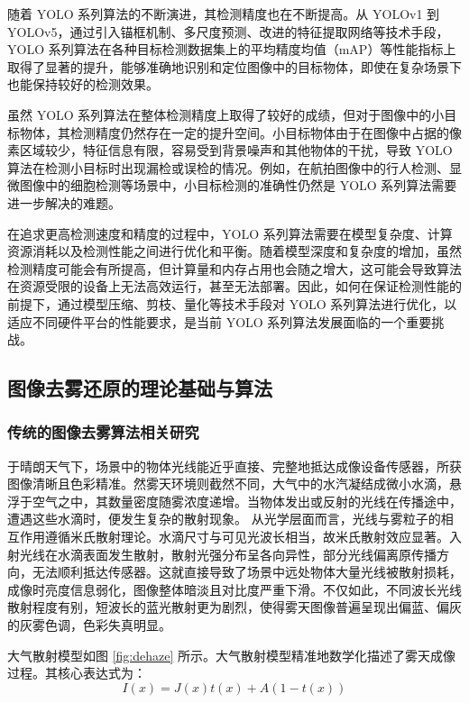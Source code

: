随着 YOLO 系列算法的不断演进，其检测精度也在不断提高。从 YOLOv1 到 YOLOv5，通过引入锚框机制、多尺度预测、改进的特征提取网络等技术手段，YOLO 系列算法在各种目标检测数据集上的平均精度均值（mAP）等性能指标上取得了显著的提升，能够准确地识别和定位图像中的目标物体，即使在复杂场景下也能保持较好的检测效果。

虽然 YOLO 系列算法在整体检测精度上取得了较好的成绩，但对于图像中的小目标物体，其检测精度仍然存在一定的提升空间。小目标物体由于在图像中占据的像素区域较少，特征信息有限，容易受到背景噪声和其他物体的干扰，导致 YOLO 算法在检测小目标时出现漏检或误检的情况。例如，在航拍图像中的行人检测、显微图像中的细胞检测等场景中，小目标检测的准确性仍然是 YOLO 系列算法需要进一步解决的难题。

在追求更高检测速度和精度的过程中，YOLO 系列算法需要在模型复杂度、计算资源消耗以及检测性能之间进行优化和平衡。随着模型深度和复杂度的增加，虽然检测精度可能会有所提高，但计算量和内存占用也会随之增大，这可能会导致算法在资源受限的设备上无法高效运行，甚至无法部署。因此，如何在保证检测性能的前提下，通过模型压缩、剪枝、量化等技术手段对 YOLO 系列算法进行优化，以适应不同硬件平台的性能要求，是当前 YOLO 系列算法发展面临的一个重要挑战。


\subsection{图像去雾还原的理论基础与算法}

\subsubsection{传统的图像去雾算法相关研究}

于晴朗天气下，场景中的物体光线能近乎直接、完整地抵达成像设备传感器，所获图像清晰且色彩精准。然雾天环境则截然不同，大气中的水汽凝结成微小水滴，悬浮于空气之中，其数量密度随雾浓度递增。当物体发出或反射的光线在传播途中，遭遇这些水滴时，便发生复杂的散射现象。
从光学层面而言，光线与雾粒子的相互作用遵循米氏散射理论。水滴尺寸与可见光波长相当，故米氏散射效应显著。入射光线在水滴表面发生散射，散射光强分布呈各向异性，部分光线偏离原传播方向，无法顺利抵达传感器。这就直接导致了场景中远处物体大量光线被散射损耗，成像时亮度信息弱化，图像整体暗淡且对比度严重下滑。不仅如此，不同波长光线散射程度有别，短波长的蓝光散射更为剧烈，使得雾天图像普遍呈现出偏蓝、偏灰的灰雾色调，色彩失真明显。

大气散射模型如图 \ref{fig:dehaze} 所示。大气散射模型精准地数学化描述了雾天成像过程。其核心表达式为：
\begin{equation}
    \label{eq:haze2}
    I(x) = J(x)t(x)+A(1-t(x))
\end{equation}

